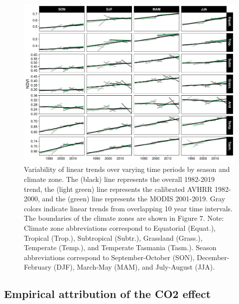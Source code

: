 \documentclass[gc, manuscript]{copernicus}
\begin{document}
\begin{figure}
\includegraphics[width=12cm]{../../figures/Fig4_ndvi_lin_rlm_trend_10yr_segs_by_Koppen} \caption{Variability of linear trends over varying time periods by season and climate zone. The (black) line represents the overall 1982-2019 trend, the (light green) line represents the calibrated AVHRR 1982-2000, and the (green) line represents the MODIS 2001-2019. Gray colors indicate linear trends from overlapping 10 year time intervals. The boundaries of the climate zones are shown in Figure 7. \linebreak Note: Climate zone abbreviations correspond to Equatorial (Equat.), Tropical (Trop.), Subtropical (Subtr.), Grassland (Grass.), Temperate (Temp.), and Temperate Tasmania (Tasm.). Season abbreviations correspond to September-October (SON), December-February (DJF), March-May (MAM), and July-August (JJA).}\label{fig:unnamed-chunk-3}
\end{figure}
\clearpage

\subsection{Empirical attribution of the CO2 effect}
\end{document}
